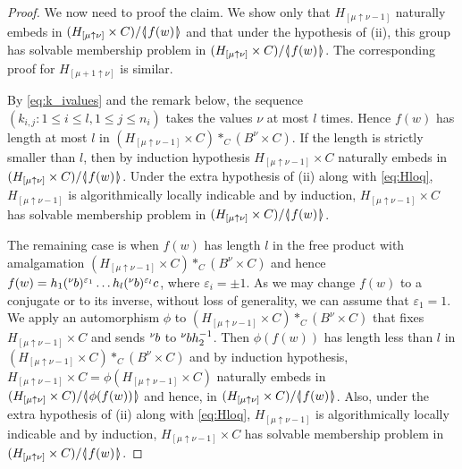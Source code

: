 \documentclass[12pt, a4paper]{amsart}
\theoremstyle{remark}
\theoremstyle{definition}
\begin{document}
\begin{proof}
We now need to proof the claim. We show only that $H_{[\mu \uparrow \nu-1]}$  naturally embeds in $(H_{[\mu\uparrow \nu]}\times C)/{{\langle}{\mkern-3.7mu}{\lvert}{\mkern1.2mu}{{f(w)}}{\mkern1.2mu}{\rvert}{\mkern-3.7mu}{\rangle}}$ and that under the hypothesis of (ii), this group has solvable membership problem in $(H_{[\mu\uparrow \nu]}\times C)/{{\langle}{\mkern-3.7mu}{\lvert}{\mkern1.2mu}{{f(w)}}{\mkern1.2mu}{\rvert}{\mkern-3.7mu}{\rangle}}$. The corresponding proof for  $H_{[\mu+1 \uparrow \nu]}$ is similar.  

By \eqref{eq:k_ivalues} and the remark below, the sequence $(k_{i,j} : 1\leq i\leq l,1\leq j\leq n_i)$ takes the values $\nu$ at most $l$ times. Hence $f(w)$ has length at most $l$ in $(H_{[\mu \uparrow \nu-1]}\times C)*_C(B^{\nu}\times C)$. If the length is strictly smaller than $l$, then  by induction hypothesis $H_{[\mu \uparrow \nu-1]}\times C$  naturally embeds in $(H_{[\mu\uparrow \nu]}\times C)/{{\langle}{\mkern-3.7mu}{\lvert}{\mkern1.2mu}{{f(w)}}{\mkern1.2mu}{\rvert}{\mkern-3.7mu}{\rangle}}$. Under the extra hypothesis of (ii) along with \eqref{eq:Hloq}, $H_{[\mu \uparrow \nu-1]}$ is algorithmically locally indicable and by induction, $H_{[\mu \uparrow \nu-1]}\times C$  has solvable membership problem in $(H_{[\mu\uparrow \nu]}\times C)/{{\langle}{\mkern-3.7mu}{\lvert}{\mkern1.2mu}{{f(w)}}{\mkern1.2mu}{\rvert}{\mkern-3.7mu}{\rangle}}$.

The remaining case is when $f(w)$ has length $l$ in the free product with amalgamation $(H_{[\mu\uparrow \nu-1]}\times C)*_{C}(B^{\nu}\times C)$ and hence $f(w)=h_1 ({{}^{{\nu}}\mkern-1mu{{b}}})^{{\varepsilon}_1}\dots h_l ({{}^{{\nu}}\mkern-1mu{{b}}})^{{\varepsilon}_l}c$, where ${\varepsilon}_i=\pm 1$. As we may change $f(w)$ to a conjugate or to its inverse, without loss of generality, we can assume that ${\varepsilon}_1=1$. We apply an automorphism $\phi$ to $(H_{[\mu\uparrow \nu-1]}\times C)*_{C}(B^{\nu}\times C)$ that fixes $H_{[\mu\uparrow \nu-1]}\times C$ and sends ${{}^{{\nu}}\mkern-1mu{{b}}}$ to ${{}^{{\nu}}\mkern-1mu{{b}}} h_2^{-1}$. Then $\phi(f(w))$ has length less than $l$ in $(H_{[\mu\uparrow \nu-1]}\times C)*_{C}(B^{\nu}\times C)$ and by induction hypothesis, $H_{[\mu \uparrow \nu-1]}\times C=\phi(H_{[\mu \uparrow \nu-1]}\times C)$  naturally embeds in $(H_{[\mu\uparrow \nu]}\times C)/{{\langle}{\mkern-3.7mu}{\lvert}{\mkern1.2mu}{{\phi(f(w))}}{\mkern1.2mu}{\rvert}{\mkern-3.7mu}{\rangle}}$ and hence, in  $(H_{[\mu\uparrow \nu]}\times C)/{{\langle}{\mkern-3.7mu}{\lvert}{\mkern1.2mu}{{f(w)}}{\mkern1.2mu}{\rvert}{\mkern-3.7mu}{\rangle}}$. Also, under the extra hypothesis of (ii) along with \eqref{eq:Hloq}, $H_{[\mu \uparrow \nu-1]}$ is algorithmically 
locally indicable and by induction, $H_{[\mu \uparrow \nu-1]}\times C$  has solvable membership problem in $(H_{[\mu\uparrow \nu]}\times C)/{{\langle}{\mkern-3.7mu}{\lvert}{\mkern1.2mu}{{f(w)}}{\mkern1.2mu}{\rvert}{\mkern-3.7mu}{\rangle}}$.


\end{proof}
\end{document}
